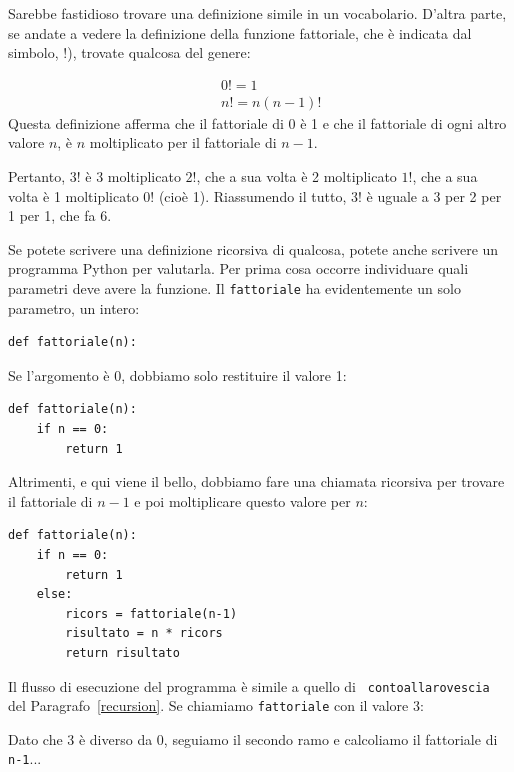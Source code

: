 \documentclass[10pt]{book}
\begin{document}
Sarebbe fastidioso trovare una definizione simile in un vocabolario.
D'altra parte, se andate a vedere la definizione della funzione fattoriale, che è indicata dal simbolo, $!$), trovate qualcosa del genere:

%
\begin{eqnarray*}
&&  0! = 1 \\
&&  n! = n (n-1)!
\end{eqnarray*}
%
Questa definizione afferma che il fattoriale di 0 è 1 e che il fattoriale di ogni altro valore $n$, è $n$ moltiplicato per il fattoriale di $n-1$.

Pertanto, $3!$ è 3 moltiplicato $2!$, che a sua volta è 2 moltiplicato $1!$, che
   a sua volta è 1 moltiplicato $0!$ (cioè 1). Riassumendo il tutto, $3!$ è uguale a 3 per 2 per 1 per 1, che fa 6.

Se potete scrivere una definizione ricorsiva di qualcosa, potete anche scrivere un programma Python per valutarla. Per prima cosa occorre individuare quali parametri deve avere la funzione. Il {\tt fattoriale} ha evidentemente un solo parametro, un intero:

\begin{verbatim}
def fattoriale(n):
\end{verbatim}
%
Se l'argomento è 0, dobbiamo solo restituire il valore 1:

\begin{verbatim}
def fattoriale(n):
    if n == 0:
        return 1
\end{verbatim}
%
Altrimenti, e qui viene il bello, dobbiamo fare una chiamata ricorsiva per trovare il fattoriale di $n-1$ e poi moltiplicare questo valore per $n$:

\begin{verbatim}
def fattoriale(n):
    if n == 0:
        return 1
    else:
        ricors = fattoriale(n-1)
        risultato = n * ricors
        return risultato
\end{verbatim}
%
Il flusso di esecuzione del programma è simile a quello di {\tt
contoallarovescia} del Paragrafo~\ref{recursion}. Se chiamiamo {\tt fattoriale}
con il valore 3:

Dato che 3 è diverso da 0, seguiamo il secondo ramo e calcoliamo il fattoriale
   di {\tt n-1}...
\end{document}
